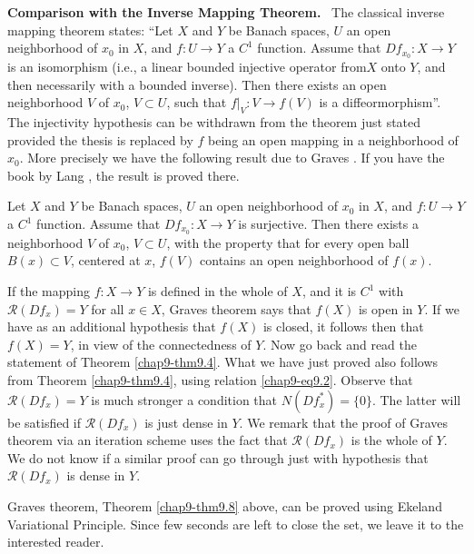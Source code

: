 \noindent
{\bf Comparison with the Inverse Mapping Theorem.}~ The classical
inverse mapping theorem states: ``Let $X$ and $Y$ be Banach spaces,
$U$ an open neighborhood of $x_{0}$ in $X$, and $f:U\to Y$ a $C^{1}$
function. Assume that $Df_{x_{0}}:X\to Y$ is an isomorphism (i.e., a
linear bounded injective operator from\pageoriginale $X$ onto $Y$, and
then necessarily with a bounded inverse). Then there exists an open
neighborhood $V$ of $x_{0}$, $V\subset U$, such that $f|_{V}:V\to
f(V)$ is a diffeormorphism''. The injectivity hypothesis can be
withdrawn from the theorem just stated provided the thesis is replaced
by $f$ being an open mapping in a neighborhood of $x_{0}$. More
precisely we have the following result due to Graves \cite{key48}. If
you have the book by Lang \cite{key56}, the result is proved there.

\begin{theorem}\label{chap9-thm9.8}
Let $X$ and $Y$ be Banach spaces, $U$ an open neighborhood of $x_{0}$
in $X$, and $f:U\to Y$ a $C^{1}$ function. Assume that
$Df_{x_{0}}:X\to Y$ is surjective. Then there exists a neighborhood
$V$ of $x_{0}$, $V\subset U$, with the property that for every open
ball $B(x)\subset V$, centered at $x$, $f(V)$ contains an open
neighborhood of $f(x)$.
\end{theorem}

\setcounter{remark}{0}
\begin{remark}\label{chap9-3rem1}
If the mapping $f:X\to Y$ is defined in the whole of $X$, and it is
$C^{1}$ with $\mathcal{R}(Df_{x})=Y$ for all $x\in X$, Graves theorem
says that $f(X)$ is open in $Y$. If we have as an additional
hypothesis that $f(X)$ is closed, it follows then that $f(X)=Y$, in
view of the connectedness of $Y$. Now go back and read the statement
of Theorem \ref{chap9-thm9.4}. What we have just proved also follows
from Theorem \ref{chap9-thm9.4}, using relation
\eqref{chap9-eq9.2}. Observe that $\mathcal{R}(Df_{x})=Y$ is much
stronger a condition that $N(Df^{*}_{x})=\{0\}$. The latter will be
satisfied if $\mathcal{R}(Df_{x})$ is just dense in $Y$. We remark
that the proof of Graves theorem via an iteration scheme uses the fact
that $\mathcal{R}(Df_{x})$ is the whole of $Y$. We do not know if a
similar proof can go through just with hypothesis that
$\mathcal{R}(Df_{x})$ is dense in $Y$.
\end{remark}

\begin{remark}\label{chap9-3rem2}
Graves theorem, Theorem \ref{chap9-thm9.8} above, can be proved using
Ekeland Variational Principle. Since few seconds are left to close the
set, we leave it to the interested reader.
\end{remark}

